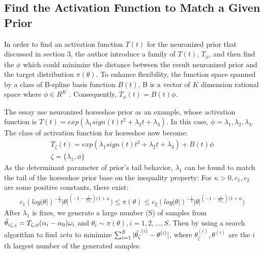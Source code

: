 \subsection{Find the Activation Function to Match a Given Prior}
In order to find an activation function $T(t)$ for the neuronized prior that discussed in section 3, the author introduce a family of $T(t)$, $T_\phi$, and then find the $\phi$ which could minimize the distance between the result neuronized prior and the target distribution $\pi(\theta)$. To enhance flexibility, the function space spanned by a class of B-spline basis function $B(t)$, B is a vector of $K$ dimension rational space where $\phi \in R^K$ . Consequently, $T_\phi(t)=B(t)\phi$.

The essay use neuronized horseshoe prior as an example, whose activation function is $T(t)=exp(\lambda_1 sign(t)t^2+\lambda_2 t+\lambda_3)$. In this case, $\phi = {\lambda_1,\lambda_2,\lambda_3}$. The class of activation function for horseshoe now become:
    \begin{align}
        T_\zeta(t) = exp(\lambda_1 sign(t)t^2+\lambda_2 t+\lambda_3)+B(t)\phi\\
        \zeta=\{\lambda_1,\phi\}
    \end{align}
As the determinant parameter of prior's tail behavior, $\lambda_1$ can be found to match the tail of the horseshoe prior base on the inequality property: For $\kappa > 0, c_1, c_2$ are some  positive constants, there exist: 
\begin{align}
    c_1(log|\theta|)^{-\frac{1}{2}}|\theta|^{(-1-\frac{1}{2\lambda_1})(1+\kappa})\leq\pi(\theta)\leq c_2(log|\theta|)^{-\frac{1}{2}}|\theta|^{(-1-\frac{1}{2\lambda_1})(1+\kappa})
\end{align}
After $\lambda_1$ is fixes, we generate a large number (S) of samples from $\Tilde{\theta_i}_{\zeta,i}=T_{\zeta,\phi}(\alpha_i-\alpha_0)\omega_i$ and $\theta_i\sim \pi(\theta), i = 1, 2,..., S$. Then by using a search algorithm to find $zeta$ to minimize $\sum_{i=1}^S |\Tilde{\theta_\zeta}^{(i)}-\theta^{(i)}|$\cite{s1983optimization}, where $\theta_\zeta^{(i)},\theta^{(i)}$ are the $i$th largest number of the generated samples.

